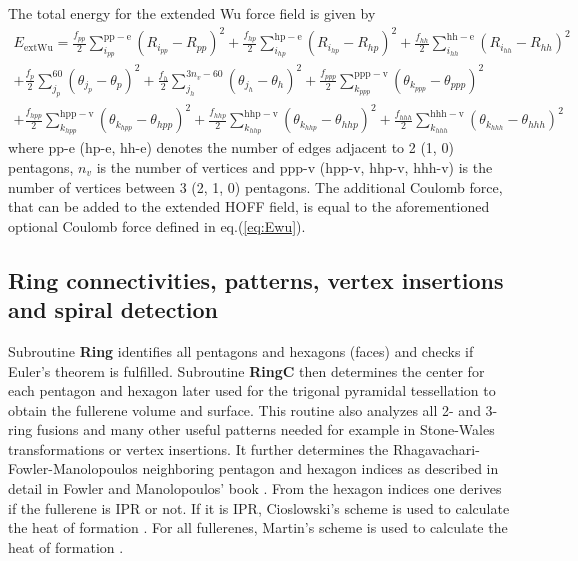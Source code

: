 \documentclass[article,a4paper,twoside]{memoir}
\newcommand{\funname}[1]{{\color{blue}\textbf{#1}}}
\begin{document}
The total energy for the extended Wu force field is given by
\begin{multline}
  \label{eq:extEwu}
  E_{\mathrm{extWu}} =
          \frac{f_{pp}}{2}  \sum_{i_{pp}}^{\mathrm{pp-e}} \left(R_{i_{pp}} - R_{pp}\right)^2 
        + \frac{f_{hp}}{2}  \sum_{i_{hp}}^{\mathrm{hp-e}} \left(R_{i_{hp}} - R_{hp}\right)^2 
        + \frac{f_{hh}}{2}  \sum_{i_{hh}}^{\mathrm{hh-e}} \left(R_{i_{hh}} - R_{hh}\right)^2\\
        + \frac{f_p}{2}     \sum_{j_p}^{60} \left(\theta_{j_p} - \theta_p\right)^2 
        + \frac{f_h}{2}     \sum_{j_h}^{3n_v-60} \left(\theta_{j_h} - \theta_h\right)^2 
        + \frac{f_{ppp}}{2} \sum_{k_{ppp}}^{\mathrm{ppp-v}} \left(\theta_{k_{ppp}} - \theta_{ppp}\right)^2 \\
        + \frac{f_{hpp}}{2} \sum_{k_{hpp}}^{\mathrm{hpp-v}} \left(\theta_{k_{hpp}} - \theta_{hpp}\right)^2 
        + \frac{f_{hhp}}{2} \sum_{k_{hhp}}^{\mathrm{hhp-v}} \left(\theta_{k_{hhp}} - \theta_{hhp}\right)^2 
        + \frac{f_{hhh}}{2} \sum_{k_{hhh}}^{\mathrm{hhh-v}} \left(\theta_{k_{hhh}} - \theta_{hhh}\right)^2
\end{multline}
where pp-e (hp-e, hh-e) denotes the number of edges adjacent to 2 (1, 0) pentagons, $n_v$ is the 
number of vertices and ppp-v (hpp-v, hhp-v, hhh-v) is the number of vertices between 3 (2, 1, 0) pentagons.
The additional Coulomb force, that can be added to the extended HOFF field, is equal to the aforementioned
optional Coulomb force defined in eq.(\ref{eq:Ewu}).

\subsection{Ring connectivities, patterns, vertex insertions and spiral detection}
Subroutine \funname{Ring} identifies all pentagons and hexagons (faces) and checks if Euler's theorem is fulfilled.
Subroutine \funname{RingC} then determines the center for each pentagon and hexagon later used for the trigonal pyramidal tessellation to obtain
the fullerene volume and surface. This routine also analyzes all 2- and 3-ring fusions and many other useful patterns needed for example
in Stone-Wales transformations or vertex insertions. It further determines the Rhagavachari-Fowler-Manolopoulos neighboring pentagon 
and hexagon indices as described in detail in Fowler and Manolopoulos' book \cite{Atlas}.
From the hexagon indices one derives if the fullerene is IPR or not. If it is IPR, Cioslowski's scheme is used to calculate the 
heat of formation \cite{Cioslowski2000}. For all fullerenes, Martin's scheme is used to calculate the heat of formation \cite{Alcami}.
\end{document}

